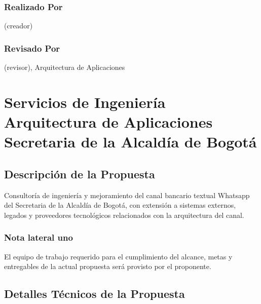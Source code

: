 \documentclass[
	a4paper, %
	12pt, %
]{include/CSSullivanBusinessReport}
\begin{document}
\subsubsection{Realizado Por}\label{sec:realizado-por}

(creador)

\subsubsection{Revisado Por}\label{sec:revisado-por}

(revisor), Arquitectura de Aplicaciones

\newpage

\section{Servicios de Ingeniería Arquitectura de Aplicaciones Secretaria
de la Alcaldía de
Bogotá}\label{sec:servicios-de-ingenieruxeda-arquitectura-de-aplicaciones-secretaria-de-la-alcalduxeda-de-bogotuxe1}

\subsection{Descripción de la
Propuesta}\label{sec:descripciuxf3n-de-la-propuesta}

\begin{quote}
\end{quote}

Consultoría de ingeniería y mejoramiento del canal bancario textual
Whatsapp del Secretaria de la Alcaldía de Bogotá, con extensión a
sistemas externos, legados y proveedores tecnológicos relacionados con
la arquitectura del canal.

\subsubsection{Nota lateral uno}\label{sec:nota-lateral-uno}

El equipo de trabajo requerido para el cumplimiento del alcance, metas y
entregables de la actual propuesta será provisto por el proponente.

\subsection{Detalles Técnicos de la
Propuesta}\label{sec:detalles-tuxe9cnicos-de-la-propuesta}

\begin{quote}
\end{quote}
\end{document}
